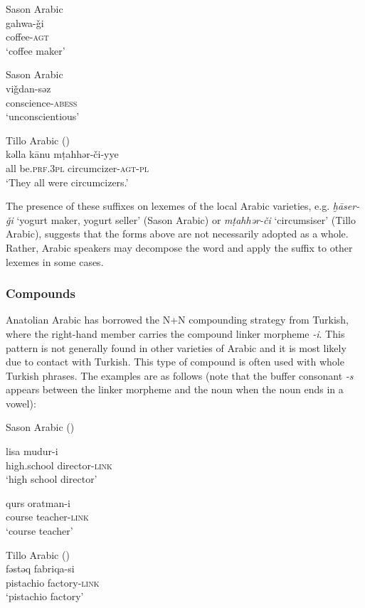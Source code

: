 \documentclass[output=paper]{langsci/langscibook}
\begin{document}
\begin{exe}
\ex 
\begin{xlist}
\ex Sason Arabic 
\\ \gll gahwa-\v{g}i \\
coffee-\textsc{agt}\\
\glt `coffee maker'

\ex Sason Arabic \\
\gll vi\v{g}dan-səz \\
conscience-\textsc{abess}\\
\glt `unconscientious'

\ex Tillo Arabic (\citealt[199]{Lahdo2009})\\
\gll kəlla k\={a}nu m\d{t}ahhər-\v{c}i-yye \\
all be.\textsc{prf.3pl} circumcizer-\textsc{agt-pl}\\
\glt  `They all were circumcizers.'
\end{xlist}
\end{exe}



\noindent The presence of these suffixes on lexemes of the local Arabic varieties, e.g. \textit{ḫ\={a}ser-\v{g}i} `yogurt maker, yogurt seller' (Sason Arabic) or \textit{m\d{t}ahhər-\v{c}i} `circumsiser' (Tillo Arabic), suggests that the forms above are not necessarily adopted as a whole. Rather, Arabic speakers may decompose the word and apply the suffix to other lexemes in some cases.

\subsubsection{Compounds}

Anatolian Arabic has borrowed the N+N compounding strategy from Turkish, where the right-hand member carries the compound linker morpheme \textit{-i}. This pattern is not generally found in other varieties of Arabic and it is most likely due to contact with Turkish. This type of compound is  often used with whole Turkish phrases. The examples are as follows (note that the buffer consonant \textit{-s} appears between the linker morpheme and the noun when the noun ends in a vowel):

\begin{exe}
\ex \label{coms} Sason Arabic (\citealt[41]{AkkusBenmamoun2018})
		\begin{xlist}
		\ex \label{com1}\gll lisa		mudur-i\\
    high.school director-\textsc{link} \\
        \glt `high school director'


	\ex \label{com2} \gll qurs 	oratman-i  \\
        course	teacher-\textsc{link}\\
        \glt `course teacher'
		\end{xlist}
        
      \ex \label{comt} Tillo Arabic (\citealt[199]{Lahdo2009})\\
      \gll fəstəq fabriqa-si \\
        pistachio factory-\textsc{link}\\
        \glt `pistachio factory' 
\end{exe}
\end{document}
